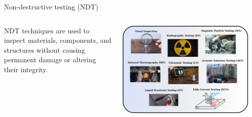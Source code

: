 \documentclass[10pt,aspectratio=169,dvipsnames]{beamer} %
\begin{document}
	\begin{frame}{Non-destructive testing (NDT)}
		\begin{columns}[T]
			\begin{column}{.35\textwidth}
				\justifying
				NDT techniques are used to inspect materials, components, and structures without causing permanent damage or altering their integrity. 
			\end{column}
			\begin{column}{.65\textwidth}
				\includegraphics[width=0.95\textwidth]{NDT.png}
			\end{column}
		\end{columns}
	\end{frame}
\end{document}
